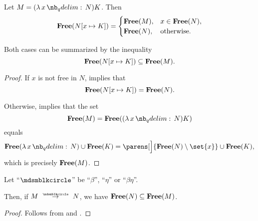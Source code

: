 \begin{lemma}\label{thm:beta_contractum_free_variables}
  Let \( M = (\qabs x N) K \). Then
  \begin{equation}\label{eq:thm:beta_contractum_free_variables/equality}
    \op*{Free}(N[x \mapsto K]) = \begin{cases}
      \op*{Free}(M), &x \in \op*{Free}(N), \\
      \op*{Free}(N), &\T{otherwise.} \\
    \end{cases}
  \end{equation}

  Both cases can be summarized by the inequality
  \begin{equation}\label{eq:thm:beta_contractum_free_variables/inequality}
    \op*{Free}(N[x \mapsto K]) \subseteq \op*{Free}(M).
  \end{equation}
\end{lemma}
\begin{proof}
  If \( x \) is not free in \( N \),  implies that
  \begin{equation*}
    \op*{Free}(N[x \mapsto K]) = \op*{Free}(N).
  \end{equation*}

  Otherwise,  implies that the set
  \begin{equation*}
    \op*{Free}(M)
    =
    \op*{Free}((\qabs x N) K)
  \end{equation*}
  equals
  \begin{equation*}
    \op*{Free}(\qabs x N) \cup \op*{Free}(K)
    =
    \parens[\Big]{ \op*{Free}(N) \setminus \set{ x } } \cup \op*{Free}(K),
  \end{equation*}
  which is precisely \( \op*{Free}(M) \).
\end{proof}

\begin{proposition}\label{thm:lambda_reduction_free_variables}
  Let \enquote{\( {\Anon} \)} be \enquote{\( \beta \)}, \enquote{\( \eta \)} or \enquote{\( \beta\eta \)}.

  Then, if \( M \pred N \), we have \( \op*{Free}(N) \subseteq \op*{Free}(M) \).
\end{proposition}
\begin{proof}
  Follows from  and .
\end{proof}

